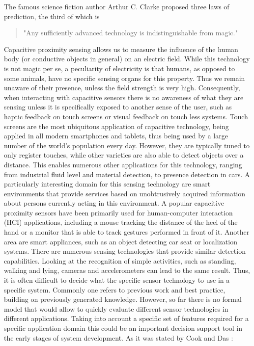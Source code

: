 The famous science fiction author Arthur C. Clarke proposed three laws of prediction, the third of which is 
\begin{quote}
"Any sufficiently advanced technology is indistinguishable from magic." \cite{clarke1962hazards} 
\end{quote}
Capacitive proximity sensing allows us to measure the influence of the human body (or conductive objects in general) on an electric field. While this technology is not magic per se, a peculiarity of electricity is that humans, as opposed to some animals, have no specific sensing organs for this property. Thus we remain unaware of their presence, unless the field strength is very high. Consequently, when interacting with capacitive sensors there is no awareness of what they are sensing unless it is specifically exposed to another sense of the user, such as haptic feedback on touch screens or visual feedback on touch less systems. Touch screens are the most ubiquitous application of capacitive technology, being applied in all modern smartphones and tablets, thus being used by a large number of the world's population every day. However, they are typically tuned to only register touches, while other varieties are also able to detect objects over a distance. This enables numerous other applications for this technology, ranging from industrial fluid level and material detection, to presence detection in cars. A particularly interesting domain for this sensing technology are smart environments that provide services based on unobtrusively acquired information about persons currently acting in this environment. A popular capacitive proximity sensors have been primarily used for human-computer interaction (HCI) applications, including a mouse tracking the distance of the heel of the hand or a monitor that is able to track gestures performed in front of it. Another area are smart appliances, such as an object detecting car seat or localization systems. There are numerous sensing technologies that provide similar detection capabilities. Looking at the recognition of simple activities, such as standing, walking and lying, cameras and accelerometers can lead to the same result. Thus, it is often difficult to decide what the specific sensor technology to use in a specific system. Commonly one refers to previous work and best practice, building on previously generated knowledge. However, so far there is no formal model that would allow to quickly evaluate different sensor technologies in different applications. Taking into account a specific set of features required for a specific application domain this could be an important decision support tool in the early stages of system development. As it was stated by Cook and Das \cite{cook2007smart}:
